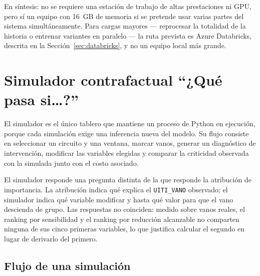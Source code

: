\documentclass[11pt,a4paper]{article}
\begin{document}
\begin{bloquenuevo}
En síntesis: no se requiere una estación de trabajo de altas prestaciones ni GPU, pero sí un
equipo con 16~GB de memoria si se pretende usar varias partes del sistema simultáneamente. Para
cargas mayores --- reprocesar la totalidad de la historia o entrenar variantes en paralelo ---
la ruta prevista es Azure Databricks, descrita en la Sección~\ref{sec:databricks}, y no
un equipo local más grande.
\end{bloquenuevo}

\section{Simulador contrafactual ``¿Qué pasa si\ldots?''}
\label{sec:simulador}

El simulador es el único tablero que mantiene un proceso de Python en ejecución, porque cada
simulación exige una inferencia nueva del modelo. Su flujo consiste en seleccionar un circuito
y una ventana, marcar vanos, generar un diagnóstico de intervención, modificar las variables
elegidas y comparar la criticidad observada con la simulada junto con el costo asociado.

El simulador responde una pregunta distinta de la que responde la atribución de importancia. La
atribución indica qué explica el \texttt{UITI\_VANO} observado; el simulador indica qué variable
modificar y hasta qué valor para que el vano descienda de grupo. Las respuestas no coinciden:
medido sobre
vanos reales, el ranking por sensibilidad y el ranking por reducción alcanzable no comparten
ninguna de sus cinco primeras variables, lo que justifica calcular el segundo en lugar de
derivarlo del
primero.

\subsection{Flujo de una simulación}
\end{document}
